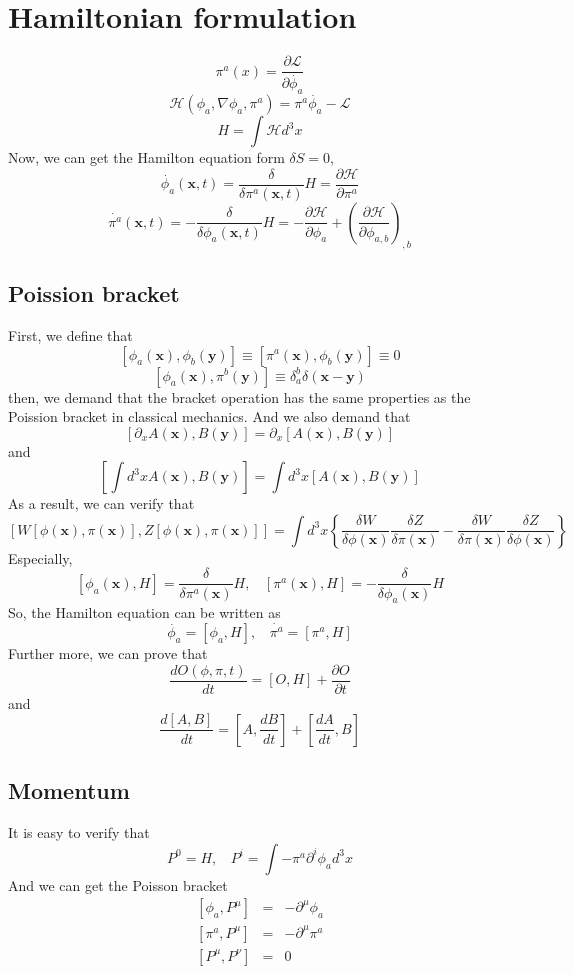 \documentclass[cyan]{elegantnote}
\begin{document}
\section{Hamiltonian formulation}
\[\pi^a(x) = \frac{\partial \mathcal{L}}{\partial \dot{\phi_a}}\]
\[\mathcal{H}(\phi_a,\nabla \phi_a,\pi^a) = \pi^a \dot{\phi_a} - \mathcal{L}\]
\[H = \int \mathcal{H} d^3 x\]
Now, we can get the Hamilton equation form $\delta S =0$,
\[\dot{\phi_a}(\bm{x},t) = \frac{\delta}{\delta \pi^a(\bm{x},t)} H = \frac{\partial \mathcal{H}}{\partial \pi^a}\]
\[\dot{\pi^a}(\bm{x},t) = -\frac{\delta}{\delta \phi_a(\bm{x},t)} H = - \frac{\partial \mathcal{H}}{\partial \phi_a} + \left(\frac{\partial \mathcal{H}}{\partial \phi_{a,b}}\right)_{,b}\]

\subsection{Poission bracket}
\noindent
First, we define that
\[[\phi_a(\bm{x}),\phi_b(\bm{y})] \equiv [\pi^a(\bm{x}),\phi_b(\bm{y})] \equiv 0\]
\[[\phi_a(\bm{x}),\pi^b(\bm{y})] \equiv \delta^{b}_{a} \delta(\bm{x}-\bm{y})\]
then, we demand that the bracket operation has the same properties as the Poission bracket in classical mechanics. And we also demand that
\[[\partial_x A(\bm{x}),B(\bm{y})] = \partial_x [A(\bm{x}),B(\bm{y})]\]
and
\[\left[\int d^3 x A(\bm{x}),B(\bm{y})\right] = \int d^3 x [A(\bm{x}),B(\bm{y})]\]
As a result, we can verify that
\[[W[\phi(\bm{x}),\pi(\bm{x})],Z[\phi(\bm{x}),\pi(\bm{x})]] = \int d^3x \left\{ \frac{\delta W}{\delta \phi(\bm{x})} \frac{\delta Z}{\delta \pi(\bm{x})} - \frac{\delta W}{\delta \pi(\bm{x})} \frac{\delta Z}{\delta \phi(\bm{x})} \right\}\]
Especially,
\[[\phi_a(\bm{x}),H] = \frac{\delta }{\delta \pi^a(\bm{x})} H, \ \ \ \ [\pi^a(\bm{x}),H] = -\frac{\delta }{\delta \phi_a(\bm{x})} H\]
So, the Hamilton equation can be written as
\[\dot{\phi_a} = [\phi_a,H], \ \ \ \ \dot{\pi^a} = [\pi^a,H]\]
Further more, we can prove that
\[\frac{dO(\phi,\pi,t)}{dt} = [O,H] + \frac{\partial O}{\partial t}\]
and
\[\frac{d[A,B]}{dt} = [A,\frac{dB}{dt}] + [\frac{dA}{dt},B]  \]

\subsection{Momentum}
\noindent
It is easy to verify that
\[P^{0} = H, \ \ \ \ P^{i} = \int -\pi^a \partial^i \phi_a d^3 x\]
And we can get the Poisson bracket
\begin{eqnarray}
\left[\phi_a,P^{\mu}\right] &=& -\partial^{\mu} \phi_a \nonumber \\
\left[\pi^a,P^{\mu}\right] &=& -\partial^{\mu} \pi^a \nonumber \\
\left[P^{\mu},P^{\nu}\right] &=& 0 \nonumber 
\end{eqnarray}
\end{document}

